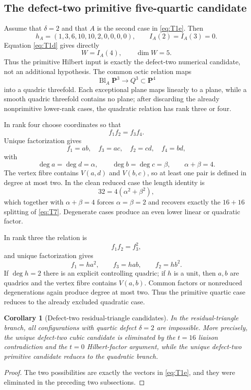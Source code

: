 \documentclass[11pt,reqno]{amsart}
\newtheorem{corollary}[theorem]{Corollary}
\theoremstyle{remark}
\newcommand{\PP}{\mathbf P}
\begin{document}
\subsection{The defect-two primitive five-quartic candidate}
Assume that $\delta=2$ and that $A$ is the second case in \eqref{eq:T1e}.  Then
\[
h_A=(1,3,6,10,10,2,0,0,0,0),
\qquad I_A(2)=I_A(3)=0.
\]
Equation \eqref{eq:T1d} gives directly
\[
\boxed{W=I_A(4),\qquad \dim W=5.}
\]
Thus the primitive Hilbert input is exactly the defect-two numerical candidate, not an additional hypothesis.  The common octic relation maps
\[
\operatorname{Bl}_A\PP^3\longrightarrow Q^3\subset\PP^4
\]
into a quadric threefold.  Each exceptional plane maps linearly to a plane, while a smooth quadric threefold contains no plane; after discarding the already nonprimitive lower-rank cases, the quadratic relation has rank three or four.

In rank four choose coordinates so that
\[
f_1f_2=f_3f_4.
\]
Unique factorization gives
\[
f_1=ab,\quad f_3=ac,\quad f_2=cd,\quad f_4=bd,
\]
with
\[
\deg a=\deg d=\alpha,
\qquad
\deg b=\deg c=\beta,
\qquad
\alpha+\beta=4.
\]
The vertex fibre contains $V(a,d)$ and $V(b,c)$, so at least one pair is defined in degree at most two.  In the clean reduced case the length identity is
\[
32=4(\alpha^2+\beta^2),
\]
which together with $\alpha+\beta=4$ forces $\alpha=\beta=2$ and recovers exactly the $16+16$ splitting of \eqref{eq:T7}.  Degenerate cases produce an even lower linear or quadratic factor.

In rank three the relation is
\[
f_1f_2=f_3^2,
\]
and unique factorization gives
\[
f_1=ha^2,
\qquad f_3=hab,
\qquad f_2=hb^2.
\]
If $\deg h=2$ there is an explicit controlling quadric; if $h$ is a unit, then $a,b$ are quadrics and the vertex fibre contains $V(a,b)$.  Common factors or nonreduced degenerations again produce degree at most two.  Thus the primitive quartic case reduces to the already excluded quadratic case.

\begin{corollary}[Defect-two residual-triangle candidates]\label{cor:triangle}
In the residual-triangle branch, all configurations with quartic defect $\delta=2$ are impossible.  More precisely, the unique defect-two cubic candidate is eliminated by the $t=16$ liaison contradiction and the $t=0$ Hilbert-factor argument, while the unique defect-two primitive candidate reduces to the quadratic branch.
\end{corollary}

\begin{proof}
The two possibilities are exactly the vectors in \eqref{eq:T1e}, and they were eliminated in the preceding two subsections.
\end{proof}
\end{document}
